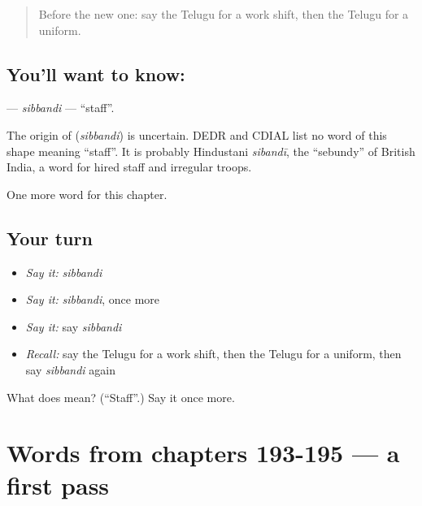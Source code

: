 \begin{quote}
Before the new one: say the Telugu for a work shift, then the Telugu for a uniform.
\end{quote}

\subsection*{You'll want to know: }
\textbf{} — \emph{sibbandi} — \textquotedblleft{}staff\textquotedblright{}.

\begin{cousinweb}
The origin of \textbf{} (\emph{sibbandi}) is uncertain. DEDR and CDIAL list no word of this shape meaning \textquotedblleft{}staff\textquotedblright{}. It is probably Hindustani \emph{sibandī}, the \textquotedblleft{}sebundy\textquotedblright{} of British India, a word for hired staff and irregular troops.
\end{cousinweb}

\begin{grammarlens}[title={What you've built}]
One more word for this chapter.
\end{grammarlens}

\subsection*{Your turn}
\begin{itemize}
\raggedright
  \item \emph{Say it:} \emph{sibbandi}
  \item \emph{Say it:} \emph{sibbandi}, once more
  \item \emph{Say it:} say \emph{sibbandi}
  \item \emph{Recall:} say the Telugu for a work shift, then the Telugu for a uniform, then say \emph{sibbandi} again
\end{itemize}

\begin{tcolorbox}[breakable,colback=teal!4,colframe=teal!35!black,title={Before you move on}]
What does  mean? (\textquotedblleft{}Staff\textquotedblright{}.) Say it once more.
\end{tcolorbox}
\section[(dialogue)]{Words from chapters 193-195 — a first pass}

\label{lesson:TE-R198-first-pass-words-from-chapters-193-195}



